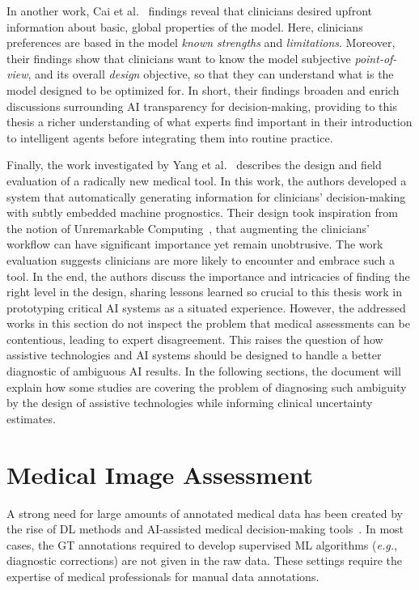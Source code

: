 In another work, Cai et al.~\cite{10.1145/3359206} findings reveal that clinicians desired upfront information about basic, global properties of the model.
Here, clinicians preferences are based in the model {\it known strengths} and {\it limitations}.
Moreover, their findings show that clinicians want to know the model subjective {\it point-of-view}, and its overall {\it design} objective, so that they can understand what is the model designed to be optimized for.
In short, their findings broaden and enrich discussions surrounding \ac{AI} transparency for decision-making, providing to this thesis a richer understanding of what experts find important in their introduction to intelligent agents before integrating them into routine practice.

Finally, the work investigated by Yang et al.~\cite{10.1145/3290605.3300468} describes the design and field evaluation of a radically new medical tool.
In this work, the authors developed a system that automatically generating information for clinicians' decision-making with subtly embedded machine prognostics.
Their design took inspiration from the notion of Unremarkable Computing~\cite{Crabtree2020}, that augmenting the clinicians' workflow can have significant importance yet remain unobtrusive.
The work evaluation suggests clinicians are more likely to encounter and embrace such a tool.
In the end, the authors discuss the importance and intricacies of finding the right level in the design, sharing lessons learned so crucial to this thesis work in prototyping critical \ac{AI} systems as a situated experience.
However, the addressed works in this section do not inspect the problem that medical assessments can be contentious, leading to expert disagreement.
This raises the question of how assistive technologies and \ac{AI} systems should be designed to handle a better diagnostic of ambiguous \ac{AI} results.
In the following sections, the document will explain how some studies are covering the problem of diagnosing such ambiguity by the design of assistive technologies while informing clinical uncertainty estimates.

\section{Medical Image Assessment}
\label{sec:chap003005}

A strong need for large amounts of annotated medical data has been created by the rise of \ac{DL} methods and \ac{AI}-assisted medical decision-making tools~\cite{10.1145/3313831.3376290}.
In most cases, the \ac{GT} annotations required to develop supervised \ac{ML} algorithms ({\it e.g.}, diagnostic corrections) are not given in the raw data.
These settings require the expertise of medical professionals for manual data annotations.

